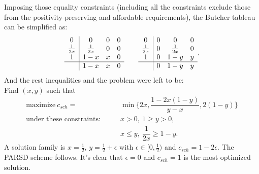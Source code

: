 Imposing those equality constraints (including all the constraints exclude those from the positivity-preserving and affordable requirements), the Butcher tableau can be simplified as:
\begin{equation}
  \begin{array}{c | c c c}
  	     0       & 0            & 0 & 0 \\
  	\frac{1}{2x} & \frac{1}{2x} & 0 & 0 \\
  	     1       & 1-x          & x & 0 \\ \hline
  	             & 1-x          & x & 0
  \end{array}
  \qquad
  \begin{array}{c | c c c}
  	     0       & 0 & 0            & 0 \\
  	\frac{1}{2x} & 0 & \frac{1}{2x} & 0 \\
  	     1       & 0 & 1-y          & y \\ \hline
  	             & 0 & 1-y          & y
  \end{array}.
\end{equation}
And the rest inequalities and the problem were left to be: \\
Find $(x,y)$ such that
\begin{align*}
\text{maximize} ~ c_{sch} = &\min \{ 2x, \dfrac{1-2x(1-y)}{y-x}, 2(1-y)\}\\
 \text{under these constraints:} \qquad & x > 0, ~ 1 \geq y > 0, \\
 & x \leq y, ~\dfrac{1}{2x} \geq 1-y.
\end{align*}
A solution family is $x=\frac{1}{2}$, $y=\frac{1}{2} + \epsilon$ with $\epsilon \in [0, \frac{1}{2})$ and $c_{sch} = 1 - 2\epsilon$.
The PARSD scheme follows.
It's clear that $\epsilon = 0$ and $c_{sch} = 1$ is the most optimized solution.